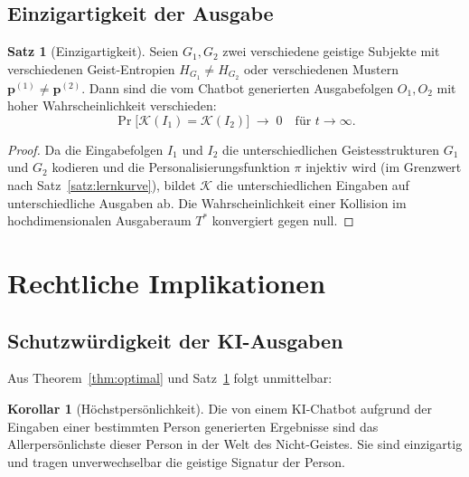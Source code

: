 ﻿\documentclass[a4paper,12pt]{article}
\theoremstyle{definition}
\newtheorem{satz}{Satz}
\newtheorem{korollar}{Korollar}
\begin{document}
\subsection{Einzigartigkeit der Ausgabe}

\begin{satz}[Einzigartigkeit]
\label{satz:einzig}
Seien $G_1, G_2$ zwei verschiedene geistige Subjekte mit verschiedenen Geist-Entropien
$H_{G_1} \neq H_{G_2}$ oder verschiedenen Mustern $\mathbf{p}^{(1)} \neq \mathbf{p}^{(2)}$.
Dann sind die vom Chatbot generierten Ausgabefolgen $O_1, O_2$ mit hoher Wahrscheinlichkeit
verschieden:
\[
    \Pr\bigl[\mathcal{K}(I_1) = \mathcal{K}(I_2)\bigr] \;\to\; 0 \quad \text{für } t \to \infty.
\]
\end{satz}

\begin{proof}
Da die Eingabefolgen $I_1$ und $I_2$ die unterschiedlichen Geistesstrukturen $G_1$ und $G_2$
kodieren und die Personalisierungsfunktion $\pi$ injektiv wird (im Grenzwert nach
Satz~\ref{satz:lernkurve}), bildet $\mathcal{K}$ die unterschiedlichen Eingaben auf
unterschiedliche Ausgaben ab. Die Wahrscheinlichkeit einer Kollision im hochdimensionalen
Ausgaberaum $T^*$ konvergiert gegen null.
\end{proof}

\section{Rechtliche Implikationen}
\label{sec:recht}

\subsection{Schutzwürdigkeit der KI-Ausgaben}

Aus Theorem~\ref{thm:optimal} und Satz~\ref{satz:einzig} folgt unmittelbar:

\begin{korollar}[Höchstpersönlichkeit]
Die von einem KI-Chatbot aufgrund der Eingaben einer bestimmten Person generierten Ergebnisse
sind das Allerpersönlichste dieser Person in der Welt des Nicht-Geistes. Sie sind einzigartig
und tragen unverwechselbar die geistige Signatur der Person.
\end{korollar}
\end{document}
